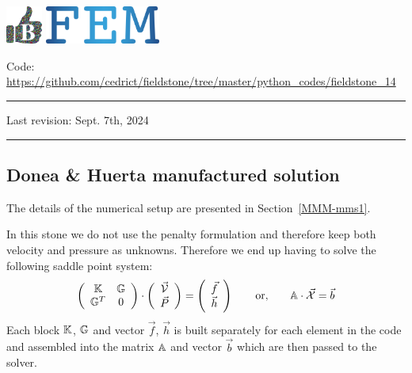\includegraphics[height=1.25cm]{images/pictograms/benchmark}
\includegraphics[height=1.25cm]{images/pictograms/FEM}




\begin{center}
\inpython
{\small Code: \url{https://github.com/cedrict/fieldstone/tree/master/python_codes/fieldstone_14}}
\end{center}

\par\noindent\rule{\textwidth}{0.4pt}

Last revision: Sept. 7th, 2024

\par\noindent\rule{\textwidth}{0.4pt}

\subsection*{Donea \& Huerta manufactured solution}

The details of the numerical setup are presented in Section~\ref{MMM-mms1}.

In this stone we do not use the penalty formulation and therefore 
keep both velocity and pressure as unknowns. Therefore we end up having to solve 
the following saddle point system:
\[
\left(
\begin{array}{cc}
{\mathbb{K}} & {\mathbb{G}} \\ {\mathbb{G}}^T & 0 
\end{array}
\right)
\cdot
\left(
\begin{array}{c}
\vec{\cal V} \\ \vec{P}
\end{array}
\right)
=
\left(
\begin{array}{c}
\vec{f} \\ \vec{h}
\end{array}
\right)
\quad\quad
{\rm or,}
\quad\quad
{\mathbb{A}} \cdot \vec{\cal X} =\vec{b}
\]
Each block ${\mathbb{K}}$, ${\mathbb{G}}$ and vector $\vec{f}$, $\vec{h}$ is built separately for each element 
in the code and assembled into 
the matrix ${\mathbb{A}}$ and vector $\vec{b}$ which are then passed to the solver. 

